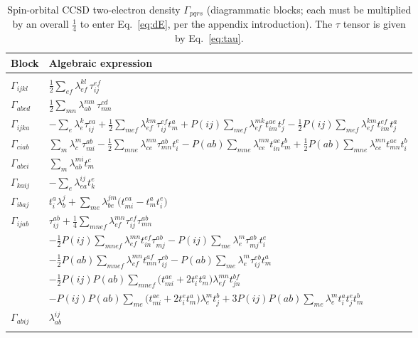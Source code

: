 \documentclass[12pt]{article}
\begin{document}
\begin{table}[H]
\caption{Spin-orbital CCSD two-electron density $\Gamma_{pqrs}$ (diagrammatic
blocks; each must be multiplied by an overall $\frac14$ to enter
Eq.~\eqref{eq:dE}, per the appendix introduction).  The $\tau$ tensor is given by
Eq.~\eqref{eq:tau}.}
\label{Table:ccsd_2pdm}
\renewcommand{\arraystretch}{1.5}
\begin{center}
\begin{tabular}{ll}
\hline\hline
Block & Algebraic expression \\
\hline
\hline
 \\
$\Gamma_{ijkl}$ & $\displaystyle \frac12 \sum_{ef}\lambda^{kl}_{ef}\,\tau_{ij}^{ef}$ \\
$\Gamma_{abcd}$ & $\displaystyle \frac12 \sum_{mn}\lambda^{mn}_{ab}\,\tau_{mn}^{cd}$ \\
$\Gamma_{ijka}$ & $\displaystyle -\sum_e\lambda^k_e\tau_{ij}^{ea} + \frac12\sum_{mef}\lambda^{km}_{ef}\tau_{ij}^{ef}t_m^a + P(ij)\sum_{mef}\lambda^{mk}_{ef}t_{im}^{ae}t_j^f - \frac12 P(ij)\sum_{mef}\lambda^{km}_{ef}t_{im}^{ef}t_j^a$ \\
$\Gamma_{ciab}$ & $\displaystyle \sum_m\lambda^m_c\tau_{mi}^{ab} - \frac12\sum_{mne}\lambda^{mn}_{ce}\tau_{mn}^{ab}t_i^e - P(ab)\sum_{mne}\lambda^{mn}_{ce}t_{in}^{ae}t_m^b + \frac12 P(ab)\sum_{mne}\lambda^{mn}_{ce}t_{mn}^{ae}t_i^b$ \\
$\Gamma_{abci}$ & $\displaystyle \sum_m\lambda^{mi}_{ab}t_m^c$ \\
$\Gamma_{kaij}$ & $\displaystyle -\sum_e\lambda^{ij}_{ea}t_k^e$ \\
$\Gamma_{ibaj}$ & $\displaystyle t_i^a\lambda^j_b + \sum_{me}\lambda^{jm}_{be}\big(t_{mi}^{ea} - t_m^a t_i^e\big)$ \\
$\Gamma_{ijab}$ & $\displaystyle \tau_{ij}^{ab} + \frac14 \sum_{mnef}\lambda^{mn}_{ef}\tau_{ij}^{ef}\tau_{mn}^{ab}$ \\
 & $\displaystyle -\frac12 P(ij)\sum_{mnef}\lambda^{mn}_{ef}t_{in}^{ef}\tau_{mj}^{ab} - P(ij)\sum_{me}\lambda^m_e\tau_{mj}^{ab}t_i^e$ \\
 & $\displaystyle -\frac12 P(ab)\sum_{mnef}\lambda^{mn}_{ef}t_{mn}^{af}\tau_{ij}^{eb} - P(ab)\sum_{me}\lambda^m_e\tau_{ij}^{eb}t_m^a$ \\
 & $\displaystyle -\frac12 P(ij)P(ab)\sum_{mnef}\big(t_{mi}^{ae}+2t_i^e t_m^a\big)\lambda^{mn}_{ef}t_{jn}^{bf}$ \\
 & $\displaystyle - P(ij)P(ab)\sum_{me}\big(t_{mi}^{ae}+2t_i^e t_m^a\big)\lambda^m_e t_j^b + 3 P(ij)P(ab)\sum_{me}\lambda^m_e t_i^a t_j^e t_m^b$ \\
$\Gamma_{abij}$ & $\displaystyle \lambda^{ij}_{ab}$ \\
 \\
\hline\hline
\end{tabular}
\end{center}
\end{table}
\end{document}
